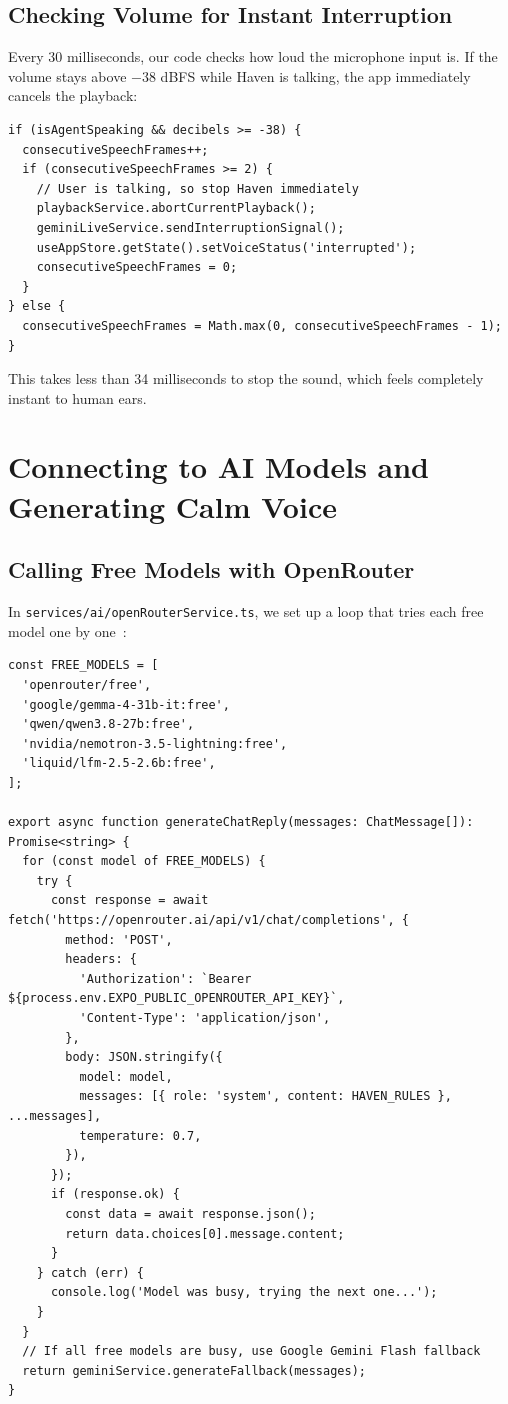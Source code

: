 \subsection{Checking Volume for Instant Interruption}
Every 30 milliseconds, our code checks how loud the microphone input is. If the volume stays above $-38$ dBFS while Haven is talking, the app immediately cancels the playback:
\begin{verbatim}
if (isAgentSpeaking && decibels >= -38) {
  consecutiveSpeechFrames++;
  if (consecutiveSpeechFrames >= 2) {
    // User is talking, so stop Haven immediately
    playbackService.abortCurrentPlayback();
    geminiLiveService.sendInterruptionSignal();
    useAppStore.getState().setVoiceStatus('interrupted');
    consecutiveSpeechFrames = 0;
  }
} else {
  consecutiveSpeechFrames = Math.max(0, consecutiveSpeechFrames - 1);
}
\end{verbatim}
This takes less than 34 milliseconds to stop the sound, which feels completely instant to human ears.

\section{Connecting to AI Models and Generating Calm Voice}
\label{sec:impl_ai_services}

\subsection{Calling Free Models with OpenRouter}
In \texttt{services/ai/openRouterService.ts}, we set up a loop that tries each free model one by one~\cite{openrouter2024docs}:
\begin{verbatim}
const FREE_MODELS = [
  'openrouter/free',
  'google/gemma-4-31b-it:free',
  'qwen/qwen3.8-27b:free',
  'nvidia/nemotron-3.5-lightning:free',
  'liquid/lfm-2.5-2.6b:free',
];

export async function generateChatReply(messages: ChatMessage[]): Promise<string> {
  for (const model of FREE_MODELS) {
    try {
      const response = await fetch('https://openrouter.ai/api/v1/chat/completions', {
        method: 'POST',
        headers: {
          'Authorization': `Bearer ${process.env.EXPO_PUBLIC_OPENROUTER_API_KEY}`,
          'Content-Type': 'application/json',
        },
        body: JSON.stringify({
          model: model,
          messages: [{ role: 'system', content: HAVEN_RULES }, ...messages],
          temperature: 0.7,
        }),
      });
      if (response.ok) {
        const data = await response.json();
        return data.choices[0].message.content;
      }
    } catch (err) {
      console.log('Model was busy, trying the next one...');
    }
  }
  // If all free models are busy, use Google Gemini Flash fallback
  return geminiService.generateFallback(messages);
}
\end{verbatim}

